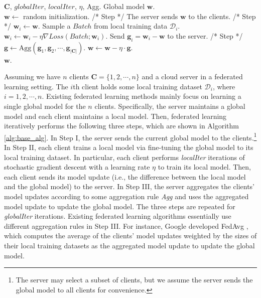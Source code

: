 \documentclass[letterpaper]{article} %
\newcommand{\RomanNumeralCaps}[1]
    {\MakeUppercase{\romannumeral #1}}
\begin{document}
\begin{algorithm}[t]
	\caption{Single-global-model federated learning}\label{alg:base_alg}
	\begin{algorithmic}[1]
		 $\mathbf{C}$, $globalIter$, $localIter$, $\eta$, Agg.
     Global model $\mathbf{w}$.\\
		\STATE $\mathbf{w} \leftarrow $ random initialization.
		    \STATE /* Step \RomanNumeralCaps{1} */
		    \STATE The server sends $\mathbf{w}$ to the clients.
	        \STATE /* Step \RomanNumeralCaps{2} */
		        \STATE $\mathbf{w}_i \leftarrow \mathbf{w}$.
		            \STATE Sample a $Batch$ from local training data $\mathcal{D}_i$.
		            \STATE $\mathbf{w}_i \leftarrow \mathbf{w}_i - \eta \nabla Loss(Batch;\mathbf{w}_i)$.
		        \ENDFOR
	            \STATE Send $\mathbf{g}_i=\mathbf{w}_i-\mathbf{w}$ to the server.
		    \ENDFOR
		    \STATE /* Step \RomanNumeralCaps{3} */
            \STATE $\mathbf{g} \leftarrow \text{Agg}(\mathbf{g}_1, \mathbf{g}_2, \cdots, \mathbf{g}_{|\mathbf{C}|})$.
            \STATE $\mathbf{w} \leftarrow \mathbf{w} - \eta\cdot \mathbf{g}$.
		\ENDFOR\\
		\RETURN $\mathbf{w}$.
	\end{algorithmic}
\end{algorithm}

Assuming we have $n$ clients $\mathbf{C}=\{1,2,\cdots,n\}$ and a cloud server in a federated learning setting. The $i$th client holds some local training dataset $\mathcal{D}_i$, where $i=1,2,\cdots,n$. Existing federated learning methods \cite{konevcny2016federated,mcmahan2016communication,wang2020federated,li2019convergence} mainly focus on learning a single global model for the $n$ clients.
Specifically, the server maintains a global model and each client maintains a local model. Then, federated learning iteratively performs the following three steps, which are shown in Algorithm \ref{alg:base_alg}. In Step I, the server sends the current global model to the clients.\footnote{The server may select a subset of clients, but we assume the server sends the global model to all clients for convenience.} In Step II, each client trains a local model via fine-tuning the global model to its local training dataset. In particular, each client performs \emph{localIter} iterations of stochastic gradient descent with a learning rate $\eta$ to train its local model. Then, each client sends its model update (i.e., the difference between the local model and the global model) to the server. In Step III, the server aggregates the clients' model updates according to some aggregation rule \emph{Agg} and uses the aggregated model update to update the global model. The three steps are repeated for \emph{globalIter} iterations. Existing federated learning algorithms essentially use different aggregation rules in Step III. For instance, Google developed FedAvg \cite{mcmahan2016communication}, which computes the average of the clients' model updates weighted by the sizes of their local training datasets as the aggregated model update  to update the global model.
\end{document}
